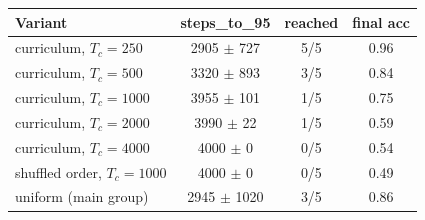 \begin{tabular}{lccc}
\toprule
Variant & steps\_to\_95 & reached & final acc \\
\midrule
curriculum, $T_c=250$ & 2905 $\pm$ 727 & 5/5 & 0.96 \\
curriculum, $T_c=500$ & 3320 $\pm$ 893 & 3/5 & 0.84 \\
curriculum, $T_c=1000$ & 3955 $\pm$ 101 & 1/5 & 0.75 \\
curriculum, $T_c=2000$ & 3990 $\pm$ 22 & 1/5 & 0.59 \\
curriculum, $T_c=4000$ & 4000 $\pm$ 0 & 0/5 & 0.54 \\
shuffled order, $T_c=1000$ & 4000 $\pm$ 0 & 0/5 & 0.49 \\
uniform (main group) & 2945 $\pm$ 1020 & 3/5 & 0.86 \\
\bottomrule
\end{tabular}
